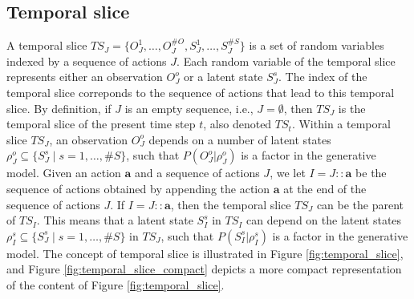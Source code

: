\documentclass[twoside,11pt]{article}
\newcommand{\nb}[1]{\# #1}
\begin{document}
\subsection{Temporal slice} \label{ssec:temporal_slice}

A temporal slice $TS_J = \{O_J^1, \hdots, O_J^{\nb{O}}, S_J^1, \hdots, S_J^{\nb{S}}\}$ is a set of random variables indexed by a sequence of actions $J$. Each random variable of the temporal slice represents either an observation $O_J^o$ or a latent state $S_J^s$. The index of the temporal slice correponds to the sequence of actions that lead to this temporal slice. By definition, if $J$ is an empty sequence, i.e., $J = \emptyset$, then $TS_J$ is the temporal slice of the present time step $t$, also denoted $TS_t$. Within a temporal slice $TS_J$, an observation $O_J^o$ depends on a number of latent states $\rho_J^o \subseteq \{S_J^s \mid s = 1, \hdots, \nb{S}\}$, such that $P(O_J^o|\rho_J^o)$ is a factor in the generative model. Given an action $\bm{a}$ and a sequence of actions $J$, we let $I = J{::}\bm{a}$ be the sequence of actions obtained by appending the action $\bm{a}$ at the end of the sequence of actions $J$. If $I = J{::}\bm{a}$, then the temporal slice $TS_J$ can be the parent of $TS_I$. This means that a latent state $S^s_I$ in $TS_I$ can depend on the latent states $\rho_I^s \subseteq \{S_J^s \mid s = 1, \hdots, \nb{S}\}$ in $TS_J$, such that $P(S_I^s|\rho_I^s)$ is a factor in the generative model. The concept of temporal slice is illustrated in Figure \ref{fig:temporal_slice}, and Figure \ref{fig:temporal_slice_compact} depicts a more compact representation of the content of Figure \ref{fig:temporal_slice}.
\end{document}
